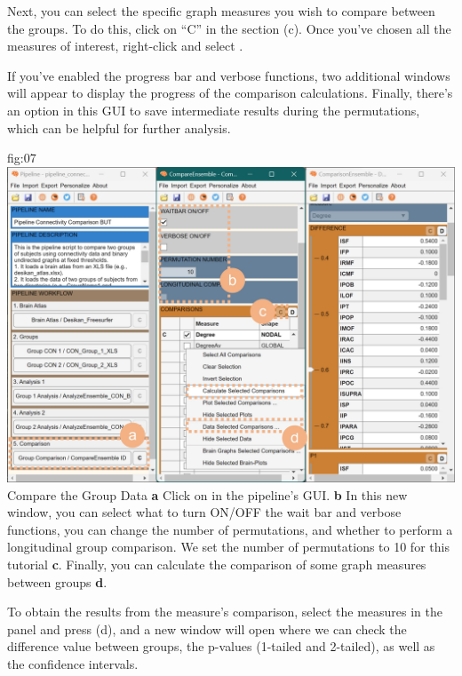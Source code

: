 \documentclass[justified]{tufte-handout}
\begin{document}
Next, you can select the specific graph measures you wish to compare between the groups. To do this, click on “C” in the  section (c). Once you've chosen all the measures of interest, right-click and select .

If you've enabled the progress bar and verbose functions, two additional windows will appear to display the progress of the comparison calculations. Finally, there's an option in this GUI to save intermediate results during the permutations, which can be helpful for further analysis.

	{fig:07}
	{
	\includegraphics{fig07.jpg}
	}
	{Compare the Group Data}
	{
	{\bf a} Click on  in the pipeline's GUI.
	{\bf b} In this new window, you can select what to turn ON/OFF the wait bar and verbose functions, you can change the number of permutations, and whether to perform a longitudinal group comparison. We set the number of permutations to 10 for this tutorial {\bf c}. Finally, you can calculate the comparison of some graph measures between groups {\bf d}.
	}
 
To obtain the results from the measure's comparison, select the measures in the  panel and press ({d}), and a new window will open where we can check the difference value between groups, the p-values (1-tailed and 2-tailed), as well as the confidence intervals.
\end{document}
